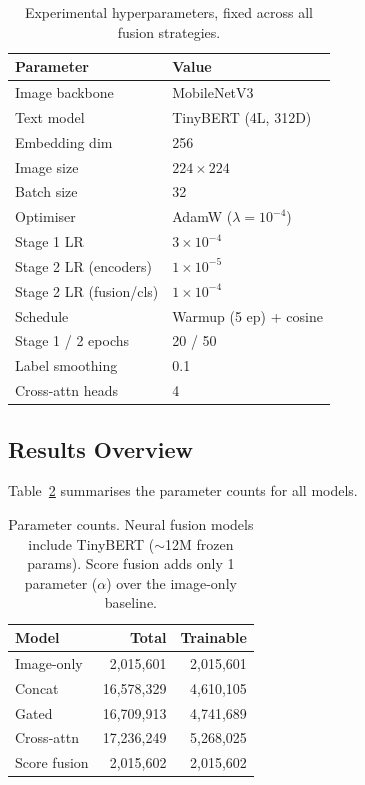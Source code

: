 \documentclass[10pt,twocolumn]{article}
\begin{document}
\begin{table}[t]
\centering
\caption{Experimental hyperparameters, fixed across all fusion strategies.}
\label{tab:hyperparams}
\small
\begin{tabular}{@{}ll@{}}
\toprule
\textbf{Parameter} & \textbf{Value} \\
\midrule
Image backbone & MobileNetV3 \\
Text model & TinyBERT (4L, 312D) \\
Embedding dim & 256 \\
Image size & $224 \times 224$ \\
Batch size & 32 \\
Optimiser & AdamW ($\lambda = 10^{-4}$) \\
Stage 1 LR & $3 \times 10^{-4}$ \\
Stage 2 LR (encoders) & $1 \times 10^{-5}$ \\
Stage 2 LR (fusion/cls) & $1 \times 10^{-4}$ \\
Schedule & Warmup (5 ep) + cosine \\
Stage 1 / 2 epochs & 20 / 50 \\
Label smoothing & 0.1 \\
Cross-attn heads & 4 \\
\bottomrule
\end{tabular}
\end{table}

\subsection{Results Overview}

Table~\ref{tab:params} summarises the parameter counts for all models.

\begin{table}[t]
\centering
\caption{Parameter counts. Neural fusion models include TinyBERT (${\sim}$12M frozen params). Score fusion adds only 1 parameter ($\alpha$) over the image-only baseline.}
\label{tab:params}
\small
\begin{tabular}{@{}lrr@{}}
\toprule
\textbf{Model} & \textbf{Total} & \textbf{Trainable} \\
\midrule
Image-only      & 2,015,601  & 2,015,601 \\
Concat          & 16,578,329 & 4,610,105 \\
Gated           & 16,709,913 & 4,741,689 \\
Cross-attn      & 17,236,249 & 5,268,025 \\
Score fusion    & 2,015,602  & 2,015,602 \\
\bottomrule
\end{tabular}
\end{table}
\end{document}
